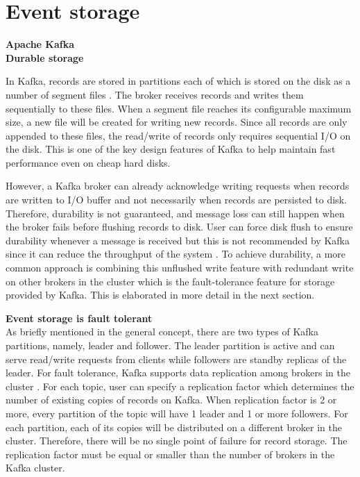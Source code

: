 \section{Event storage}
\large \textbf{Apache Kafka}\\
\normalsize
\textbf{Durable storage}

In Kafka, records are stored in partitions each of which is stored on the disk as a number of segment files \cite{kafkalog}. The broker receives records and writes them sequentially to these files. When a segment file reaches its configurable maximum size, a new file will be created for writing new records. Since all records are only appended to these files, the read/write of records only requires sequential I/O on the disk. This is one of the key design features of Kafka to help maintain fast performance even on cheap hard disks.  

However, a Kafka broker can already acknowledge writing requests when records are written to I/O buffer and not necessarily when records are persisted to disk. Therefore, durability is not guaranteed, and message loss can still happen when the broker fails before flushing records to disk. User can force disk flush to ensure durability whenever a message is received but this is not recommended by Kafka since it can reduce the throughput of the system \cite{kafkaflushmessage}. To achieve durability, a more common approach is combining this unflushed write feature with redundant write on other brokers in the cluster which is the fault-tolerance feature for storage provided by Kafka. This is elaborated in more detail in the next section.

\textbf{Event storage is fault tolerant}\\
As briefly mentioned in the general concept, there are two types of Kafka partitions, namely, leader and follower. The leader partition is active and can serve read/write requests from clients while followers are standby replicas of the leader. For fault tolerance, Kafka supports data replication among brokers in the cluster \cite{kafkadatareplication}. For each topic, user can specify a replication factor which determines the number of existing copies of records on Kafka.  When replication factor is 2 or more, every partition of the topic will have 1 leader and 1 or more followers. For each partition, each of its copies will be distributed on a different broker in the cluster. Therefore, there will be no single point of failure for record storage. The replication factor must be equal or smaller than the number of brokers in the Kafka cluster.


